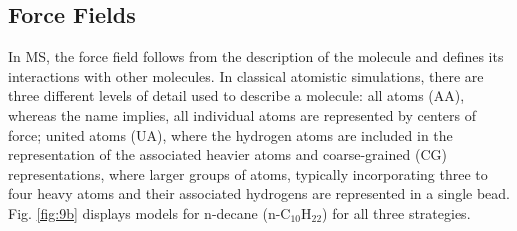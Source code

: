 \documentclass[9pt,tutorial]{livecoms}
\begin{document}
\subsection{Force Fields}
\label{sec:forcefields}
In MS, the force field follows from the description of the molecule and defines
its interactions with other molecules. In classical atomistic simulations,
there are three different levels of detail used to describe a molecule: all
atoms (AA), whereas the name implies, all individual atoms are represented by
centers of force; united atoms (UA), where the hydrogen atoms are included in
the representation of the associated heavier atoms and coarse-grained (CG)
representations, where larger groups of atoms, typically incorporating three to
four heavy atoms and their associated hydrogens are represented in a single
bead. Fig. \ref{fig:9b} displays models for n-decane (n-C$_{10}$H$_{22}$) for all three strategies.
\end{document}
